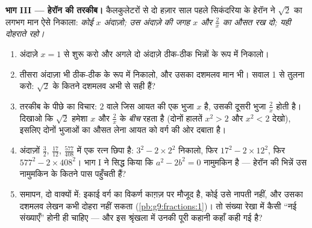 \begin{problem}
\medskip
\noindent\textbf{भाग III --- हेरॉन की तरकीब।}
कैलकुलेटरों से दो हज़ार साल पहले सिकंदरिया के हेरॉन ने $\sqrt2$ का
लगभग मान ऐसे निकाला: \emph{कोई $x$ अंदाज़ो; उस अंदाज़े की जगह $x$ और
$\frac2x$ का औसत रख दो; यही दोहराते रहो।}
\begin{enumerate}[resume]
  \item अंदाज़े $x = 1$ से शुरू करो और अगले दो अंदाज़े ठीक-ठीक भिन्नों
        के रूप में निकालो।
  \item तीसरा अंदाज़ा भी ठीक-ठीक  के रूप में निकालो, और उसका
        दशमलव मान भी। सवाल 1 से तुलना करो: $\sqrt2$ के कितने दशमलव
        अभी से सही हैं?
  \item तरकीब के पीछे का विचार:  $2$ वाले जिस आयत की एक
        भुजा $x$ है, उसकी दूसरी भुजा $\frac2x$ होती है। दिखाओ कि
        $\sqrt2$ हमेशा $x$ और $\frac2x$ के \emph{बीच} रहता है
        (दोनों हालतें $x^2 > 2$ और $x^2 < 2$ देखो), इसलिए दोनों
        भुजाओं का औसत लेना आयत को वर्ग की ओर दबाता है।
  \item अंदाज़ों $\frac32$, $\frac{17}{12}$, $\frac{577}{408}$ में
        एक रत्न छिपा है: $3^2 - 2 \times 2^2$ निकालो, फिर
        $17^2 - 2 \times 12^2$, फिर $577^2 - 2 \times 408^2$।
        भाग I ने सिद्ध किया कि $a^2 - 2b^2 = 0$ नामुमकिन है ---
        हेरॉन की भिन्नें उस नामुमकिन के कितने पास पहुँचती हैं?
  \item समापन, दो वाक्यों में: इकाई वर्ग का विकर्ण काग़ज़ पर मौजूद
        है, कोई  उसे नापती नहीं, और उसका दशमलव लेखन कभी दोहरा
        नहीं सकता (\cref{pb:g9:fractions:1})। तो संख्या रेखा में
        कैसी ``नई संख्याएँ'' होनी ही चाहिए --- और इस श्रृंखला में
        उनकी पूरी कहानी कहाँ कही गई है?

\end{enumerate}
\end{problem}
